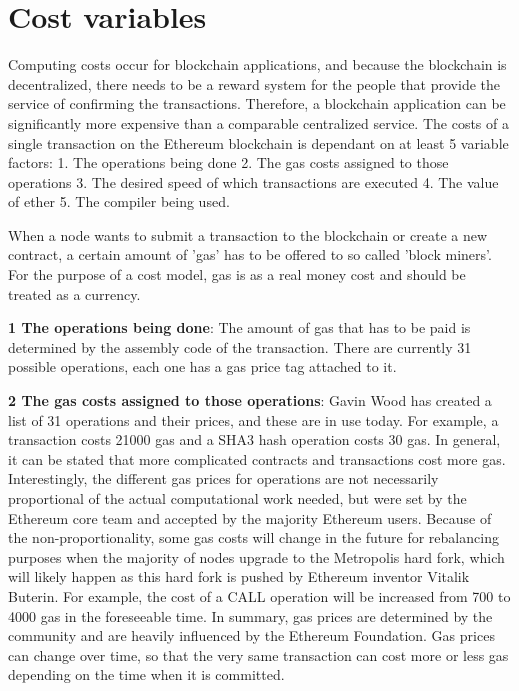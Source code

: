 \section{Cost variables}
Computing costs occur for blockchain applications, and because the blockchain is decentralized, there needs to be a reward system for the people that provide the service of confirming the transactions.
Therefore, a blockchain application can be significantly more expensive than a comparable centralized service. The costs of a single transaction on the Ethereum blockchain is dependant on at least 5 variable factors: 1. The operations being done 2. The gas costs assigned to those operations 3. The desired speed of which transactions are executed 4. The value of ether 5. The compiler being used.

When a node wants to submit a transaction to the blockchain or create a new contract, a certain amount of {'}gas{'} has to be offered to so called {'}block miners{'}. For the purpose of a cost model, gas is as a real money cost and should be treated as a currency.

\textbf{1 The operations being done}: The amount of gas that has to be paid is determined by the assembly code of the transaction. There are currently 31 possible operations, each one has a gas price tag attached to it.

\par
\textbf{2 The gas costs assigned to those operations}: Gavin Wood has created a list of 31 operations and their prices, and these are in use today. For example, a transaction costs 21000 gas and a SHA3 hash operation costs 30 gas. In general, it can be stated that more complicated contracts and transactions cost more gas. Interestingly, the different gas prices for operations are not necessarily proportional of the actual computational work needed, but were set by the Ethereum core team and accepted by the majority Ethereum users. Because of the non-proportionality, some gas costs will change in the future for rebalancing purposes when the majority of nodes upgrade to the Metropolis hard fork, which will likely happen as this hard fork is pushed by Ethereum inventor Vitalik Buterin. For example, the cost of a CALL operation will be increased from 700 to 4000 gas in the foreseeable time.
In summary, gas prices are determined by the community and are heavily influenced by the Ethereum Foundation. Gas prices can change over time, so that the very same transaction can cost more or less gas depending on the time when it is committed.

